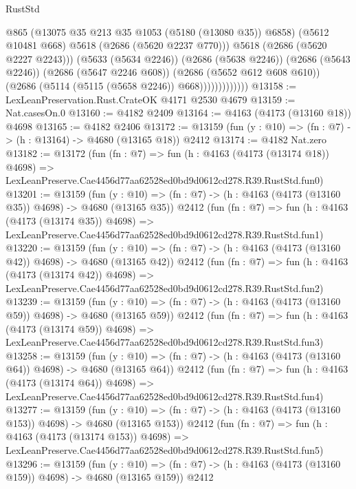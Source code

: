 \begin{lexlean}{RustStd}
\begin{coremodule}
                              @865
                              (@13075 @35 @213 @35 @1053 (@5180 (@13080 @35)) @6858)
                              (@5612 @10481 @668)
                              @5618
                              (@2686 (@5620 @2237 @770)))
                            @5618
                            (@2686 (@5620 @2227 @2243)))
                          (@5633 (@5634 @2246))
                          (@2686 (@5638 @2246))
                          (@2686 (@5643 @2246))
                          (@2686 (@5647 @2246 @608))
                          (@2686 (@5652 @612 @608 @610))
                          (@2686 (@5114 (@5115 (@5658 @2246)) @668)))))))))))))
@13158 := LexLeanPreservation.Rust.CrateOK @4171 @2530 @4679
@13159 := Nat.casesOn.{0}
@13160 := @4182 @2409
@13164 := @4163 (@4173 (@13160 @18)) @4698
@13165 := @4182 @2406
@13172 := @13159 (fun (y : @10) => (fn : @7) -> (h : @13164) -> @4680 (@13165 @18)) @2412
@13174 := @4182 Nat.zero
@13182 := @13172
    (fun (fn : @7) =>
    fun (h : @4163 (@4173 (@13174 @18)) @4698) =>
    LexLeanPreserve.Cae4456d77aa62528ed0bd9d0612cd278.R39.RustStd.fun0)
@13201 := @13159
    (fun (y : @10) => (fn : @7) -> (h : @4163 (@4173 (@13160 @35)) @4698) -> @4680 (@13165 @35))
    @2412
    (fun (fn : @7) =>
    fun (h : @4163 (@4173 (@13174 @35)) @4698) =>
    LexLeanPreserve.Cae4456d77aa62528ed0bd9d0612cd278.R39.RustStd.fun1)
@13220 := @13159
    (fun (y : @10) => (fn : @7) -> (h : @4163 (@4173 (@13160 @42)) @4698) -> @4680 (@13165 @42))
    @2412
    (fun (fn : @7) =>
    fun (h : @4163 (@4173 (@13174 @42)) @4698) =>
    LexLeanPreserve.Cae4456d77aa62528ed0bd9d0612cd278.R39.RustStd.fun2)
@13239 := @13159
    (fun (y : @10) => (fn : @7) -> (h : @4163 (@4173 (@13160 @59)) @4698) -> @4680 (@13165 @59))
    @2412
    (fun (fn : @7) =>
    fun (h : @4163 (@4173 (@13174 @59)) @4698) =>
    LexLeanPreserve.Cae4456d77aa62528ed0bd9d0612cd278.R39.RustStd.fun3)
@13258 := @13159
    (fun (y : @10) => (fn : @7) -> (h : @4163 (@4173 (@13160 @64)) @4698) -> @4680 (@13165 @64))
    @2412
    (fun (fn : @7) =>
    fun (h : @4163 (@4173 (@13174 @64)) @4698) =>
    LexLeanPreserve.Cae4456d77aa62528ed0bd9d0612cd278.R39.RustStd.fun4)
@13277 := @13159
    (fun (y : @10) => (fn : @7) -> (h : @4163 (@4173 (@13160 @153)) @4698) -> @4680 (@13165 @153))
    @2412
    (fun (fn : @7) =>
    fun (h : @4163 (@4173 (@13174 @153)) @4698) =>
    LexLeanPreserve.Cae4456d77aa62528ed0bd9d0612cd278.R39.RustStd.fun5)
@13296 := @13159
    (fun (y : @10) => (fn : @7) -> (h : @4163 (@4173 (@13160 @159)) @4698) -> @4680 (@13165 @159))
    @2412

\end{coremodule}
\end{lexlean}
